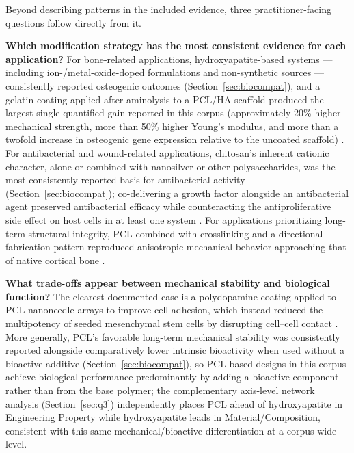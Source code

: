 \documentclass[5p,times,twocolumn]{elsarticle}
\begin{document}
Beyond describing patterns in the included evidence, three practitioner-facing questions follow directly from it.

\textbf{Which modification strategy has the most consistent evidence for each application?} For bone-related applications, hydroxyapatite-based systems --- including ion-/metal-oxide-doped formulations and non-synthetic sources --- consistently reported osteogenic outcomes (Section~\ref{sec:biocompat}), and a gelatin coating applied after aminolysis to a PCL/HA scaffold produced the largest single quantified gain reported in this corpus (approximately 20\% higher mechanical strength, more than 50\% higher Young's modulus, and more than a twofold increase in osteogenic gene expression relative to the uncoated scaffold) \cite{ref18}. For antibacterial and wound-related applications, chitosan's inherent cationic character, alone or combined with nanosilver or other polysaccharides, was the most consistently reported basis for antibacterial activity (Section~\ref{sec:biocompat}); co-delivering a growth factor alongside an antibacterial agent preserved antibacterial efficacy while counteracting the antiproliferative side effect on host cells in at least one system \cite{ref25}. For applications prioritizing long-term structural integrity, PCL combined with crosslinking and a directional fabrication pattern reproduced anisotropic mechanical behavior approaching that of native cortical bone \cite{ref1}.

\textbf{What trade-offs appear between mechanical stability and biological function?} The clearest documented case is a polydopamine coating applied to PCL nanoneedle arrays to improve cell adhesion, which instead reduced the multipotency of seeded mesenchymal stem cells by disrupting cell--cell contact \cite{ref60}. More generally, PCL's favorable long-term mechanical stability was consistently reported alongside comparatively lower intrinsic bioactivity when used without a bioactive additive (Section~\ref{sec:biocompat}), so PCL-based designs in this corpus achieve biological performance predominantly by adding a bioactive component rather than from the base polymer; the complementary axis-level network analysis (Section~\ref{sec:q3}) independently places PCL ahead of hydroxyapatite in Engineering Property while hydroxyapatite leads in Material/Composition, consistent with this same mechanical/bioactive differentiation at a corpus-wide level.
\end{document}
